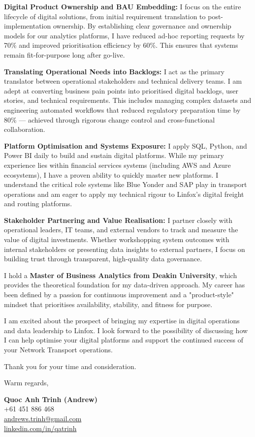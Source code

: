 \documentclass[11pt, a4paper]{article}
\begin{document}
\textbf{Digital Product Ownership and BAU Embedding:}
I focus on the entire lifecycle of digital solutions, from initial requirement translation to post-implementation ownership. By establishing clear governance and ownership models for our analytics platforms, I have reduced ad-hoc reporting requests by 70\% and improved prioritisation efficiency by 60\%. This ensures that systems remain fit-for-purpose long after go-live.

\textbf{Translating Operational Needs into Backlogs:}
I act as the primary translator between operational stakeholders and technical delivery teams. I am adept at converting business pain points into prioritised digital backlogs, user stories, and technical requirements. This includes managing complex datasets and engineering automated workflows that reduced regulatory preparation time by 80\% --- achieved through rigorous change control and cross-functional collaboration.

\textbf{Platform Optimisation and Systems Exposure:}
I apply SQL, Python, and Power BI daily to build and sustain digital platforms. While my primary experience lies within financial services systems (including AWS and Azure ecosystems), I have a proven ability to quickly master new platforms. I understand the critical role systems like Blue Yonder and SAP play in transport operations and am eager to apply my technical rigour to Linfox’s digital freight and routing platforms.

\textbf{Stakeholder Partnering and Value Realisation:}
I partner closely with operational leaders, IT teams, and external vendors to track and measure the value of digital investments. Whether workshopping system outcomes with internal stakeholders or presenting data insights to external partners, I focus on building trust through transparent, high-quality data governance.

I hold a \textbf{Master of Business Analytics from Deakin University}, which provides the theoretical foundation for my data-driven approach. My career has been defined by a passion for continuous improvement and a "product-style" mindset that prioritises availability, stability, and fitness for purpose.

I am excited about the prospect of bringing my expertise in digital operations and data leadership to Linfox. I look forward to the possibility of discussing how I can help optimise your digital platforms and support the continued success of your Network Transport operations.

Thank you for your time and consideration.

\vspace{20pt}

Warm regards,

\vspace{30pt}

\textbf{Quoc Anh Trinh (Andrew)}\\
+61 451 886 468\\
\href{mailto:andrews.trinh@gmail.com}{andrews.trinh@gmail.com}\\
\href{https://www.linkedin.com/in/qatrinh}{linkedin.com/in/qatrinh}
\end{document}
